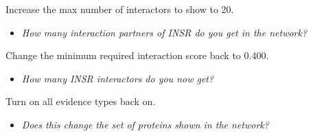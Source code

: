 \documentclass[a4paper]{article}
\begin{document}
Increase the max number of interactors to show to 20.

\begin{itemize}
  \item \textit{How many interaction partners of INSR do you get in the network?}
\end{itemize}

Change the minimum required interaction score back to 0.400.

\begin{itemize}
  \item \textit{How many INSR interactors do you now get?}
\end{itemize}

Turn on all evidence types back on.

\begin{itemize}
  \item \textit{Does this change the set of proteins shown in the network?}
\end{itemize}
\end{document}
